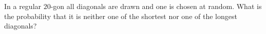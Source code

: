 In a regular $20$-gon all diagonals are drawn and one is chosen at random. What is the probability that it is neither one of the shortest nor one of the longest diagonals?
